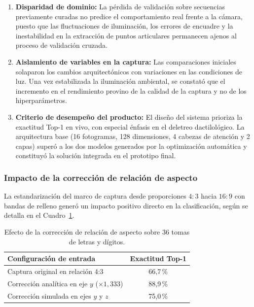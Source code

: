 \begin{enumerate}
    \item \textbf{Disparidad de dominio:} La pérdida de validación sobre secuencias previamente curadas no predice el comportamiento real frente a la cámara, puesto que las fluctuaciones de iluminación, los errores de encuadre y la inestabilidad en la extracción de puntos articulares permanecen ajenos al proceso de validación cruzada.
    \item \textbf{Aislamiento de variables en la captura:} Las comparaciones iniciales solaparon los cambios arquitectónicos con variaciones en las condiciones de luz. Una vez estabilizada la iluminación ambiental, se constató que el incremento en el rendimiento provino de la calidad de la captura y no de los hiperparámetros.
    \item \textbf{Criterio de desempeño del producto:} El diseño del sistema prioriza la exactitud Top-1 en vivo, con especial énfasis en el deletreo dactilológico. La arquitectura base (16 fotogramas, 128 dimensiones, 4 cabezas de atención y 2 capas) superó a los dos modelos generados por la optimización automática y constituyó la solución integrada en el prototipo final.
\end{enumerate}


\subsubsection{Impacto de la corrección de relación de aspecto}
La estandarización del marco de captura desde proporciones $4:3$ hacia $16:9$ con bandas de relleno generó un impacto positivo directo en la clasificación, según se detalla en el Cuadro~\ref{tab:aspect}.

\begin{table}[H]
    \centering
    \small
    \caption{Efecto de la corrección de relación de aspecto sobre 36 tomas de letras y dígitos.}
    \label{tab:aspect}
    \begin{tabular}{lc}
        \toprule
        \textbf{Configuración de entrada} & \textbf{Exactitud Top-1} \\
        \midrule
        Captura original en relación 4:3 & 66{,}7\,\% \\
        Corrección analítica en eje $y$ ($\times 1{,}333$) & 88{,}9\,\% \\
        Corrección simulada en ejes $y$ y $z$ & 75{,}0\,\% \\
        \bottomrule
    \end{tabular}
\end{table}

